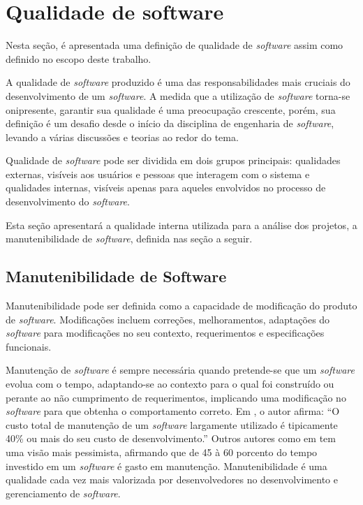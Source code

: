 %



\section{Qualidade de software} \label {sec:softwareMetrics}
Nesta seção, é apresentada uma definição de qualidade de \textit{software} assim como definido no escopo deste trabalho.

A qualidade de \textit{software} produzido é uma das responsabilidades mais cruciais do desenvolvimento de um \textit{software}. A medida que a utilização de \textit{software }torna-se onipresente, garantir sua qualidade é uma preocupação crescente, porém, sua definição é um desafio desde o início da disciplina de engenharia de \textit{software}, levando a várias discussões e teorias ao redor do tema.

Qualidade de \textit{software} pode ser dividida em dois grupos principais: qualidades externas, visíveis aos usuários e pessoas que interagem com o sistema e qualidades internas, visíveis apenas para aqueles envolvidos no processo de desenvolvimento do \textit{software}.

Esta seção apresentará a qualidade interna utilizada para a análise dos projetos, a manutenibilidade de \textit{software}, definida nas seção a seguir.
\subsection{Manutenibilidade de Software} \label{sec:maintainability}
Manutenibilidade pode ser definida como a capacidade de modificação
do produto de \textit{software}. Modificações incluem correções, melhoramentos,
adaptações do \textit{software} para modificações no seu contexto, requerimentos
e especificações funcionais\cite{van1993software}.

Manutenção de \textit{software} é sempre necessária quando pretende-se que
um \textit{software} evolua com o tempo, adaptando-se ao contexto para o qual
foi construído ou perante ao não cumprimento de requerimentos, implicando
uma modificação no \textit{software} para que obtenha o comportamento correto.
Em \cite{brooks1995mythical}, o autor afirma: ``O custo total de manutenção de um \textit{software} largamente utilizado
é tipicamente 40\% ou mais do seu custo de desenvolvimento.''
Outros autores como em \cite{parikh1983tutorial}tem uma visão
mais pessimista, afirmando que de 45 à 60 porcento do tempo investido
em um \textit{software} é gasto em manutenção. Manutenibilidade é uma qualidade
cada vez mais valorizada por desenvolvedores no desenvolvimento e
gerenciamento de \textit{software}.

